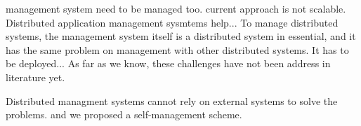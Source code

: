 



management system need to be managed too. current approach
is not scalable. 
Distributed application management sysmtems help... To
manage distributed systems, the management system itself is
a distributed system in essential, and it has the same
problem on management with other distributed systems. It has
to be deployed... As far as we know, these challenges have
not been address in literature yet.

Distributed managment systems cannot rely on external
systems to solve the problems. and we proposed a
self-management scheme.


